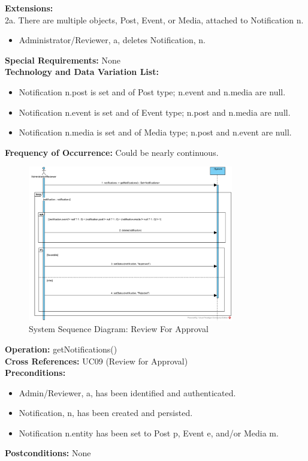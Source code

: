 \textbf{Extensions:} \\
2a. There are multiple objects, Post, Event, or Media, attached to Notification n.
\begin{itemize}
    \item Administrator/Reviewer, a, deletes Notification, n.
\end{itemize}
\textbf{Special Requirements:} None \\
\textbf{Technology and Data Variation List:}
\begin{itemize}
    \item Notification n.post is set and of Post type; n.event and n.media are null.
    \item Notification n.event is set and of Event type; n.post and n.media are null.
    \item Notification n.media is set and of Media type; n.post and n.event are null.
\end{itemize}
\textbf{Frequency of Occurrence:} Could be nearly continuous. \\

\begin{figure}[H]
    \centering
    \includegraphics[width=0.8\textwidth]{images/SSD-UC09-ReviewForApproval.png}
    \centering
    \caption{System Sequence Diagram: Review For Approval}
\end{figure}

\textbf{Operation:} getNotifications() \\
\textbf{Cross References:} UC09 (Review for Approval) \\
\textbf{Preconditions:}
\begin{itemize}
    \item Admin/Reviewer, a, has been identified and authenticated.
    \item Notification, n, has been created and persisted.
    \item Notification n.entity has been set to Post p, Event e, and/or Media m.
\end{itemize}
\textbf{Postconditions:} None \\


